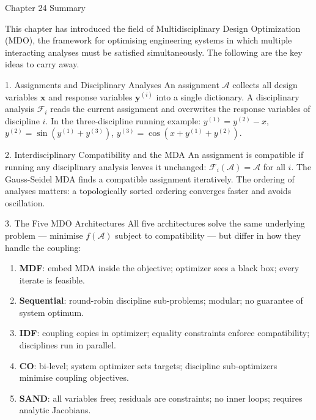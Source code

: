 \documentclass[aspectratio=169,10pt]{beamer}
\begin{document}
\begin{frame}[allowframebreaks]{Chapter 24 Summary}

  This chapter has introduced the field of Multidisciplinary Design
  Optimization (MDO), the framework for optimising engineering systems
  in which multiple interacting analyses must be satisfied simultaneously.
  The following are the key ideas to carry away.

  \begin{block}{1. Assignments and Disciplinary Analyses}
    An assignment $\mathcal{A}$ collects all design variables
    $\mathbf{x}$ and response variables $\mathbf{y}^{(i)}$ into a single
    dictionary.  A disciplinary analysis $\mathcal{F}_i$ reads the current
    assignment and overwrites the response variables of discipline $i$.
    In the three-discipline running example:
    $y^{(1)} = y^{(2)} - x$, $y^{(2)} = \sin(y^{(1)} + y^{(3)})$,
    $y^{(3)} = \cos(x + y^{(1)} + y^{(2)})$.
  \end{block}

  \begin{block}{2. Interdisciplinary Compatibility and the MDA}
    An assignment is compatible if running any disciplinary analysis leaves
    it unchanged: $\mathcal{F}_i(\mathcal{A}) = \mathcal{A}$ for all $i$.
    The Gauss-Seidel MDA finds a compatible assignment iteratively.
    The ordering of analyses matters: a topologically sorted ordering
    converges faster and avoids oscillation.
  \end{block}

  \begin{block}{3. The Five MDO Architectures}
    All five architectures solve the same underlying problem --- minimise
    $f(\mathcal{A})$ subject to compatibility --- but differ in how they
    handle the coupling:
    \begin{enumerate}
      \item \textbf{MDF}: embed MDA inside the objective; optimizer sees
            a black box; every iterate is feasible.
      \item \textbf{Sequential}: round-robin discipline sub-problems;
            modular; no guarantee of system optimum.
      \item \textbf{IDF}: coupling copies in optimizer; equality constraints
            enforce compatibility; disciplines run in parallel.
      \item \textbf{CO}: bi-level; system optimizer sets targets; discipline
            sub-optimizers minimise coupling objectives.
      \item \textbf{SAND}: all variables free; residuals are constraints;
            no inner loops; requires analytic Jacobians.
    \end{enumerate}
  \end{block}


\end{frame}
\end{document}
